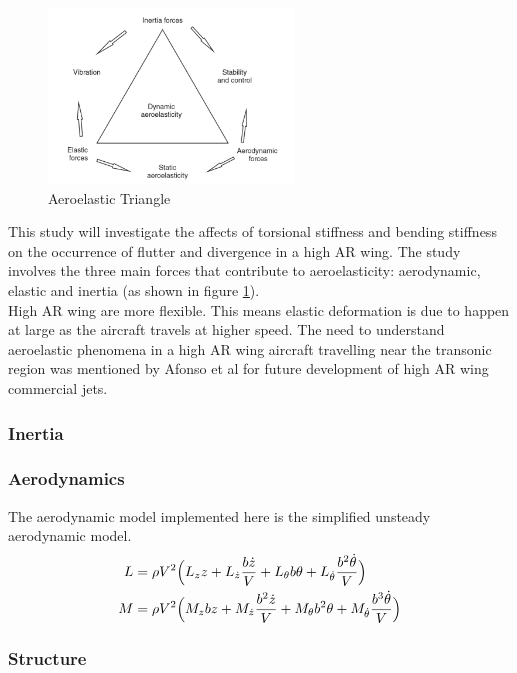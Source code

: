 \documentclass{article}
\begin{document}
\begin{figure}
    \includegraphics[width=6.5cm]{figures/aeroelas_triangle.png}
    \caption{Aeroelastic Triangle}
    \label{aero-tri}
\end{figure} 

This study will investigate the affects of torsional stiffness and bending stiffness on the occurrence of flutter and divergence in a high AR wing. The study involves the three main forces that contribute to aeroelasticity: aerodynamic, elastic and inertia (as shown in figure \ref{aero-tri}).\\

High AR wing are more flexible. This means elastic deformation is due to happen at large as the aircraft travels at higher speed. The need to understand aeroelastic phenomena in a high AR wing aircraft travelling near the transonic region was mentioned by Afonso et al \cite{Afonso2017AWings} for future development of high AR wing commercial jets.

\subsubsection{Inertia}

\subsubsection{Aerodynamics}
The aerodynamic model implemented here is the simplified unsteady aerodynamic model.
\begin{align}
L &= \rho V^2 \Big{(}L_z z + L_{\dot z}\frac{b\dot z}{V}+L_{\theta}b\theta + L_{\dot \theta}\frac{b^2 \dot \theta}{V}\Big{)} \\
M &= \rho V^2 \Big{(} M_z bz + M_{\dot z} \frac{b^2 \dot z}{V} + M_{\theta} b^2 \theta + M_{\dot \theta} \frac{b^3 \dot \theta}{V} \Big{)}
\end{align}

\subsubsection{Structure}
\end{document}

